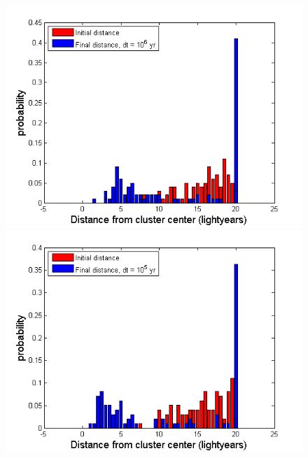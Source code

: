 \begin{figure}[H]
\centering
\begin{minipage}{.5\textwidth}
  \centering
  \includegraphics[width=1\linewidth]{Figures/graphs_VV/pos1_VV.png}
\end{minipage}%
\begin{minipage}{.5\textwidth}
  \centering
  \includegraphics[width=1\linewidth]{Figures/graphs_VV/pos2_VV.png}
\end{minipage}
\begin{minipage}{.5\textwidth}
  \centering

\end{minipage}
\end{figure}
